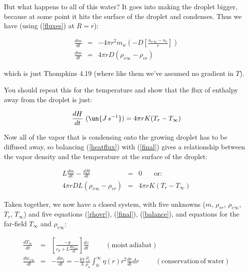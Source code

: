 \documentclass[12pt]{article}
\begin{document}
But what happens to all of this water?  It goes into making the
droplet bigger, because at some point it hits the surface of the
droplet and condenses.  Thus we have (using (\ref{fluxes}) at $R=r$):

\begin{eqnarray}
  \label{final}
  \frac{dm}{dt}& =& -4 \pi r^2 m_w \left ( -D \left [ \frac{n_{v\,\infty} - n_r}{r} \right ] \right ) 
        \nonumber\\ 
  \frac{dm}{dt}& = &4 \pi r D (\rho_{v \infty} - \rho_{v r})
\end{eqnarray}

\noindent
which is just Thompkins 4.19 (where like them we've assumed no gradient
in $T$).

You should repeat this for the temperature and show that the flux of
enthalpy away from the droplet is just:


\begin{equation}
  \label{heatflux}
  \frac{dH}{dt}~(\un{J\,s^{-1}})= 4 \pi r K (T_r - T_\infty)
\end{equation}

Now all of the vapor that is condensing onto the growing droplet has
to be diffused away, so balancing (\ref{heatflux}) with (\ref{final})
gives a relationship between the vapor density and the temperature at
the surface of the droplet:

\begin{eqnarray}
  \label{balance}
  L \frac{dm}{dt} - \frac{dH}{dt} &=& 0 ~\mathrm{~~~~~~~or:} \nonumber\\
  4 \pi  r D L ( \rho_{v \infty} - \rho_{v r})&=&  4 \pi r K (T_r
  - T_\infty )
\end{eqnarray}


Taken together, we now have a closed system, with five unknowns
($m$, $\rho_{v r}$, $\rho_{v \infty}$, $T_r$, $T_\infty$) and five
equations (\ref{rhovr}), (\ref{final}), (\ref{balance}), and equations for
the far-field $T_\infty$ and $\rho_{v \infty}$: 

\begin{eqnarray}
  \label{moistad}
  \frac{dT_\infty}{dt}& =& \left [ \frac{ -g}{c_p + L \frac{d w_{v \infty}}{dt}}
     \right ] \frac{dz}{dt}~~~~~~~~~~~(\mathrm{moist~adiabat})\nonumber\\
  \frac{dw_{v \infty}}{dt}& =& -\frac{dw_{l}}{dt}= -\frac{4 \pi}{3}
   \frac{\rho_l}{\rho_a} \int_0^\infty \eta(r) r^2 \frac{dr}{dt} dr~~~~~~~~~~~(\mathrm{conservation~of~water})
\end{eqnarray}
\end{document}
